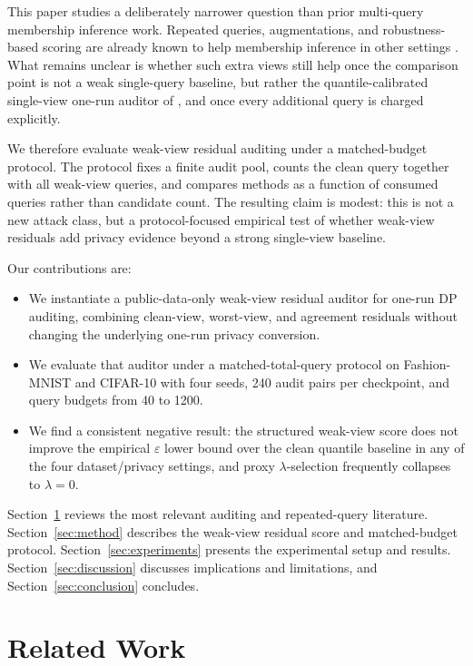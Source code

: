 \documentclass{article}
\newcommand{\eps}{\varepsilon}
\begin{document}
This paper studies a deliberately narrower question than prior multi-query membership inference work. Repeated queries, augmentations, and robustness-based scoring are already known to help membership inference in other settings \citep{he2022semileak,rahimian2020sampling,choquettechoo2021labelonly,wu2024yoqo}. What remains unclear is whether such extra views still help once the comparison point is not a weak single-query baseline, but rather the quantile-calibrated single-view one-run auditor of \citet{liu2025enhancing}, and once every additional query is charged explicitly.

We therefore evaluate weak-view residual auditing under a matched-budget protocol. The protocol fixes a finite audit pool, counts the clean query together with all weak-view queries, and compares methods as a function of consumed queries rather than candidate count. The resulting claim is modest: this is not a new attack class, but a protocol-focused empirical test of whether weak-view residuals add privacy evidence beyond a strong single-view baseline.

Our contributions are:
\begin{itemize}[leftmargin=*,topsep=2pt,itemsep=2pt]
    \item We instantiate a public-data-only weak-view residual auditor for one-run DP auditing, combining clean-view, worst-view, and agreement residuals without changing the underlying one-run privacy conversion.
    \item We evaluate that auditor under a matched-total-query protocol on Fashion-MNIST and CIFAR-10 with four seeds, 240 audit pairs per checkpoint, and query budgets from 40 to 1200.
    \item We find a consistent negative result: the structured weak-view score does not improve the empirical \(\eps\) lower bound over the clean quantile baseline in any of the four dataset/privacy settings, and proxy \(\lambda\)-selection frequently collapses to \(\lambda=0\).
\end{itemize}

Section~\ref{sec:related} reviews the most relevant auditing and repeated-query literature. Section~\ref{sec:method} describes the weak-view residual score and matched-budget protocol. Section~\ref{sec:experiments} presents the experimental setup and results. Section~\ref{sec:discussion} discusses implications and limitations, and Section~\ref{sec:conclusion} concludes.

\section{Related Work}
\label{sec:related}
\end{document}
